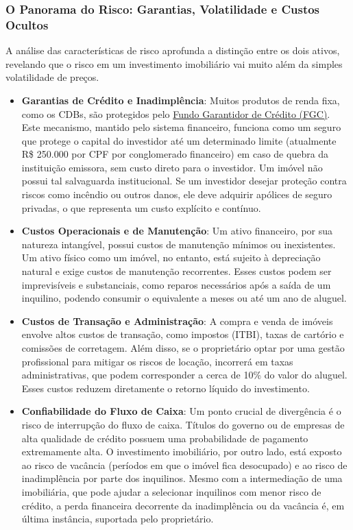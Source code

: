 \documentclass[
  a4paper,
]{book}
\begin{document}
\subsubsection{O Panorama do Risco: Garantias, Volatilidade e Custos
Ocultos}\label{o-panorama-do-risco-garantias-volatilidade-e-custos-ocultos}

A análise das características de risco aprofunda a distinção entre os
dois ativos, revelando que o risco em um investimento imobiliário vai
muito além da simples volatilidade de preços.

\begin{itemize}
\item
  \textbf{Garantias de Crédito e Inadimplência}: Muitos produtos de
  renda fixa, como os CDBs, são protegidos pelo
  \href{https://www.bb.com.br/site/investimentos/fgc/}{Fundo Garantidor
  de Crédito (FGC)}. Este mecanismo, mantido pelo sistema financeiro,
  funciona como um seguro que protege o capital do investidor até um
  determinado limite (atualmente R\$ 250.000 por CPF por conglomerado
  financeiro) em caso de quebra da instituição emissora, sem custo
  direto para o investidor. Um imóvel não possui tal salvaguarda
  institucional. Se um investidor desejar proteção contra riscos como
  incêndio ou outros danos, ele deve adquirir apólices de seguro
  privadas, o que representa um custo explícito e contínuo.
\item
  \textbf{Custos Operacionais e de Manutenção}: Um ativo financeiro, por
  sua natureza intangível, possui custos de manutenção mínimos ou
  inexistentes. Um ativo físico como um imóvel, no entanto, está sujeito
  à depreciação natural e exige custos de manutenção recorrentes. Esses
  custos podem ser imprevisíveis e substanciais, como reparos
  necessários após a saída de um inquilino, podendo consumir o
  equivalente a meses ou até um ano de aluguel.
\item
  \textbf{Custos de Transação e Administração}: A compra e venda de
  imóveis envolve altos custos de transação, como impostos (ITBI), taxas
  de cartório e comissões de corretagem. Além disso, se o proprietário
  optar por uma gestão profissional para mitigar os riscos de locação,
  incorrerá em taxas administrativas, que podem corresponder a cerca de
  10\% do valor do aluguel. Esses custos reduzem diretamente o retorno
  líquido do investimento.
\item
  \textbf{Confiabilidade do Fluxo de Caixa}: Um ponto crucial de
  divergência é o risco de interrupção do fluxo de caixa. Títulos do
  governo ou de empresas de alta qualidade de crédito possuem uma
  probabilidade de pagamento extremamente alta. O investimento
  imobiliário, por outro lado, está exposto ao risco de vacância
  (períodos em que o imóvel fica desocupado) e ao risco de inadimplência
  por parte dos inquilinos. Mesmo com a intermediação de uma
  imobiliária, que pode ajudar a selecionar inquilinos com menor risco
  de crédito, a perda financeira decorrente da inadimplência ou da
  vacância é, em última instância, suportada pelo proprietário.
\end{itemize}
\end{document}
